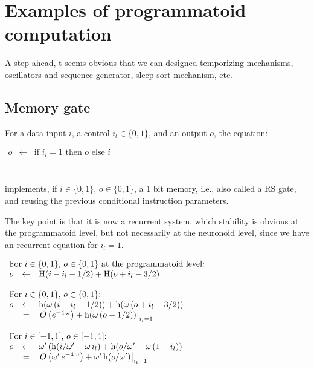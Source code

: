 \documentclass[a4]{article} \usepackage[left=2cm,right=3cm,top=1cm,bottom=2cm]{geometry}
\newcommand{\eqline}[1]{~\vspace{0.1cm}\\\centerline{$#1$}\vspace{0.1cm}\\}
\begin{document}
\section{Examples of programmatoid computation}

A step ahead, t seems obvious that we can designed temporizing mechanisms, oscillators and sequence generator, sleep sort mechanism, etc.

\subsection{Memory gate}

For a data input $i$, a control $i_l \in \{0, 1\}$, and an output $o$, the equation:
\eqline{\begin{array}{rcl}
    o &\leftarrow& \mbox{if } i_l = 1 \mbox{ then } o \mbox{ else } i \\
\end{array}}
implements, if $i \in \{0, 1\}$, $o \in \{0, 1\}$, a 1 bit memory, i.e., also called a RS gate, and reusing the previous conditional instruction parameters.

The key point is that it is now a recurrent system, which stability is obvious at the programmatoid level,
but not necessarily at the neuronoid level, since we have an recurrent equation for $i_l = 1$.
\eqline{\begin{array}{rcl}
     \multicolumn{3}{l}{\mbox{For $i \in \{0, 1\}$, $o \in \{0, 1\}$ at the programmatoid level:}} \\
     o &\leftarrow& \mbox{H}(i - i_l - 1/2) + \mbox{H}(o + i_l - 3/2) \\
    &&\\\multicolumn{3}{l}{\mbox{For $i \in \{0, 1\}$, $o \in \{0, 1\}$:}} \\
     o &\leftarrow& \mbox{h}(\omega \, (i - i_l - 1/2) ) + \mbox{h}(\omega \, (o + i_l - 3/2)) \\
    &=& \left. O\left(e^{-4\,\omega}\right) + \mbox{h}(\omega \, (o  - 1/2)) \right|_{i_l = 1} \\
    &&\\\multicolumn{3}{l}{\mbox{For $i \in [-1, 1]$, $o \in [-1, 1]$:}} \\
    o &\leftarrow& \omega' \, (\mbox{h}(i/\omega' -  \omega \, i_l) + \mbox{h}(o /\omega' -  \omega \, (1 - i_l)) \\
    &=& \left. O\left(\omega' \, e^{-4\,\omega}\right) + \omega' \, \mbox{h}(o/\omega') \right|_{i_l = 1} \\
\end{array}}
\end{document}
